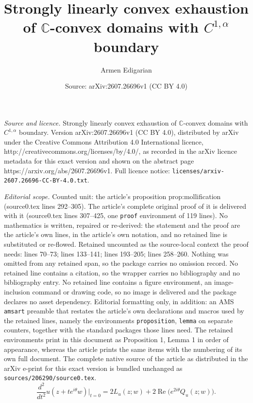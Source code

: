 \documentclass[10pt,a4paper]{amsart}
\title{Strongly linearly convex exhaustion of $\mathbb C$-convex domains with $C^{1,\alpha}$ boundary}
\author{Armen Edigarian}
\date{Source: arXiv:2607.26696v1 (CC BY 4.0)}
\begin{document}
\maketitle

\noindent\emph{Source and licence.} Strongly linearly convex exhaustion of $\mathbb C$-convex domains with $C^{1,\alpha}$ boundary. Version arXiv:2607.26696v1 (CC BY 4.0), distributed by arXiv under the Creative Commons Attribution 4.0 International licence, http://creativecommons.org/licenses/by/4.0/, as recorded in the arXiv licence metadata for this exact version and shown on the abstract page https://arxiv.org/abs/2607.26696v1. Full licence notice: \texttt{licenses/arxiv-2607.26696-CC-BY-4.0.txt}.\par\smallskip

\noindent\textit{Editorial scope.} Counted unit: the article's proposition prop:mollification (source0.tex lines 292--305). The article's complete original proof of it is delivered with it (source0.tex lines 307--425, one \texttt{proof} environment of 119 lines). No mathematics is written, repaired or re-derived: the statement and the proof are the article's own lines, in the article's own notation, and no retained line is substituted or re-flowed.  Retained uncounted as the source-local context the proof needs: lines 70--73; lines 133--141; lines 193--205; lines 258--260.  Nothing was omitted from any retained span, so the package carries no omission record.  No retained line contains a citation, so the wrapper carries no bibliography and no bibliography entry.  No retained line contains a figure environment, an image-inclusion command or drawing code, so no image is delivered and the package declares no asset dependency.  Editorial formatting only, in addition: an AMS \texttt{amsart} preamble that restates the article's own declarations and macros used by the retained lines, namely the environments \texttt{proposition}, \texttt{lemma} on separate counters, together with the standard packages those lines need.  The retained environments print in this document as Proposition 1, Lemma 1 in order of appearance, whereas the article prints the same items with the numbering of its own full document.  The complete native source of the article as distributed in the arXiv e-print for this exact version is bundled unchanged as \texttt{sources/206290/source0.tex}.
\begin{equation}\label{eq:complex-line-second}
 \frac{d^2}{dt^2}u(z+t e^{i\theta}w)\bigg|_{t=0}
 =2L_u(z;w)+2\operatorname{Re}\bigl(e^{2i\theta}Q_u(z;w)\bigr).
\end{equation}
\end{document}
